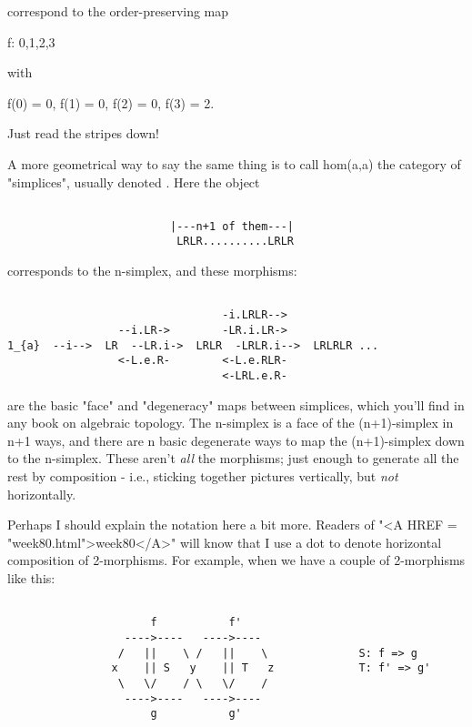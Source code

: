correspond to the order-preserving map 

f: {0,1,2,3} 

with 

f(0) = 0, f(1) = 0, f(2) = 0, f(3) = 2.  

Just read the stripes down!

A more geometrical way to say the same thing is to call hom(a,a) the
category of "simplices", usually denoted \Delta .   Here the object 


\begin{verbatim}

                         |---n+1 of them---|
                          LRLR..........LRLR
\end{verbatim}
    
corresponds to the n-simplex, and these morphisms:


\begin{verbatim}

                                 -i.LRLR-->
                 --i.LR->        -LR.i.LR->
1_{a}  --i-->  LR  --LR.i->  LRLR  -LRLR.i-->  LRLRLR ...
                 <-L.e.R-        <-L.e.RLR-
                                 <-LRL.e.R-

\end{verbatim}
    
are the basic "face" and "degeneracy" maps between
simplices, which you'll find in any book on algebraic topology.  The
n-simplex is a face of the (n+1)-simplex in n+1 ways, and there are n
basic degenerate ways to map the (n+1)-simplex down to the
n-simplex. These aren't \emph{all} the morphisms; just enough to generate all
the rest by composition - i.e., sticking together pictures vertically,
but \emph{not} horizontally.

Perhaps I should explain the notation here a bit more.  Readers of
"<A HREF = "week80.html">week80</A>" will know that I use a dot to denote horizontal composition of
2-morphisms.  For example, when we have a couple of 2-morphisms like
this:


\begin{verbatim}

                      f           f'
                  ---->----   ---->----  
                 /   ||    \ /   ||    \              S: f => g
                x    || S   y    || T   z             T: f' => g'
                 \   \/    / \   \/    /
                  ---->----   ---->----
                      g           g'
\end{verbatim}
    
